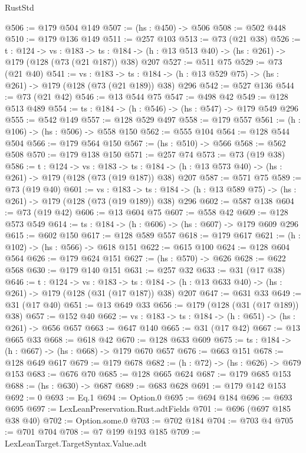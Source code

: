 \begin{lexlean}{RustStd}
\begin{coremodule}
{\begin{coremodule}
{{{{@506 := @179 @504 @149
@507 := (hs : @450) -> @506
@508 := @502 @448
@510 := @179 @136 @149
@511 := @257 @103
@513 := @73 (@21 @38)
@526 := {t : @124} ->
  {vs : @183} ->
  {ts : @184} -> (h : @13 @513 @40) -> (hs : @261) -> @179 (@128 (@73 (@21 @187)) @38) @207
@527 := @511 @75
@529 := @73 (@21 @40)
@541 := {vs : @183} ->
  {ts : @184} -> (h : @13 @529 @75) -> (hs : @261) -> @179 (@128 (@73 (@21 @189)) @38) @296
@542 := @527 @136
@544 := @73 (@21 @42)
@546 := @13 @544 @75
@547 := @498 @42
@549 := @128 @513 @489
@554 := {ts : @184} -> (h : @546) -> (hs : @547) -> @179 @549 @296
@555 := @542 @149
@557 := @128 @529 @497
@558 := @179 @557
@561 := (h : @106) -> (hs : @506) -> @558 @150
@562 := @555 @104
@564 := @128 @544 @504
@566 := @179 @564 @150
@567 := (hs : @510) -> @566
@568 := @562 @508
@570 := @179 @138 @150
@571 := @257 @74
@573 := @73 (@19 @38)
@586 := {t : @124} ->
  {vs : @183} ->
  {ts : @184} -> (h : @13 @573 @40) -> (hs : @261) -> @179 (@128 (@73 (@19 @187)) @38) @207
@587 := @571 @75
@589 := @73 (@19 @40)
@601 := {vs : @183} ->
  {ts : @184} -> (h : @13 @589 @75) -> (hs : @261) -> @179 (@128 (@73 (@19 @189)) @38) @296
@602 := @587 @138
@604 := @73 (@19 @42)
@606 := @13 @604 @75
@607 := @558 @42
@609 := @128 @573 @549
@614 := {ts : @184} -> (h : @606) -> (hs : @607) -> @179 @609 @296
@615 := @602 @150
@617 := @128 @589 @557
@618 := @179 @617
@621 := (h : @102) -> (hs : @566) -> @618 @151
@622 := @615 @100
@624 := @128 @604 @564
@626 := @179 @624 @151
@627 := (hs : @570) -> @626
@628 := @622 @568
@630 := @179 @140 @151
@631 := @257 @32
@633 := @31 (@17 @38)
@646 := {t : @124} ->
  {vs : @183} ->
  {ts : @184} -> (h : @13 @633 @40) -> (hs : @261) -> @179 (@128 (@31 (@17 @187)) @38) @207
@647 := @631 @33
@649 := @31 (@17 @40)
@651 := @13 @649 @33
@656 := @179 (@128 (@31 (@17 @189)) @38)
@657 := @152 @40
@662 := {vs : @183} -> {ts : @184} -> (h : @651) -> (hs : @261) -> @656 @657
@663 := @647 @140
@665 := @31 (@17 @42)
@667 := @13 @665 @33
@668 := @618 @42
@670 := @128 @633 @609
@675 := {ts : @184} -> (h : @667) -> (hs : @668) -> @179 @670 @657
@676 := @663 @151
@678 := @128 @649 @617
@679 := @179 @678
@682 := (h : @72) -> (hs : @626) -> @679 @153
@683 := @676 @70
@685 := @128 @665 @624
@687 := @179 @685 @153
@688 := (hs : @630) -> @687
@689 := @683 @628
@691 := @179 @142 @153
@692 := 0
@693 := Eq.{1}
@694 := Option.{0}
@695 := @694 @184
@696 := @693 @695
@697 := LexLeanPreservation.Rust.adtFields
@701 := @696 (@697 @185 @38 @40)
@702 := Option.some.{0}
@703 := @702 @184
@704 := @703 @4
@705 := @701 @704
@708 := @7 @199 @193 @185
@709 := LexLeanTarget.TargetSyntax.Value.adt
}}}}
\end{coremodule}}
\end{coremodule}
\end{lexlean}
